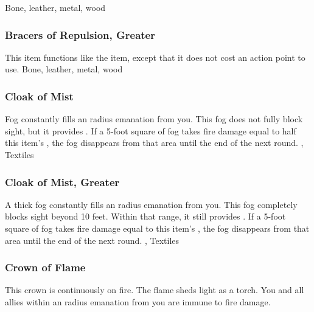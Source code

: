  
 Bone, leather, metal, wood
\lowercase{\hypertarget{item:Bracers of Repulsion, Greater}{}}\label{item:Bracers of Repulsion, Greater}
\hypertarget{item:Bracers of Repulsion, Greater}{\subsubsection{Bracers of Repulsion, Greater\hfill{}}}
This item functions like the  item, except that it does not cost an action point to use.
 
 Bone, leather, metal, wood
\lowercase{\hypertarget{item:Cloak of Mist}{}}\label{item:Cloak of Mist}
\hypertarget{item:Cloak of Mist}{\subsubsection{Cloak of Mist\hfill{}}}
Fog constantly fills an \areamed radius emanation from you.
This fog does not fully block sight, but it provides \concealment.
If a 5-foot square of fog takes fire damage equal to half this item's , the fog disappears from that area until the end of the next round.
 , 
 Textiles
\lowercase{\hypertarget{item:Cloak of Mist, Greater}{}}\label{item:Cloak of Mist, Greater}
\hypertarget{item:Cloak of Mist, Greater}{\subsubsection{Cloak of Mist, Greater\hfill{}}}
A thick fog constantly fills an \areamed radius emanation from you.
This fog completely blocks sight beyond 10 feet.
Within that range, it still provides \concealment.
If a 5-foot square of fog takes fire damage equal to this item's , the fog disappears from that area until the end of the next round.
 , 
 Textiles
\lowercase{\hypertarget{item:Crown of Flame}{}}\label{item:Crown of Flame}
\hypertarget{item:Crown of Flame}{\subsubsection{Crown of Flame\hfill{}}}
This crown is continuously on fire.
The flame sheds light as a torch.
You and all allies within an \arealarge radius emanation from you are immune to fire damage.
 
